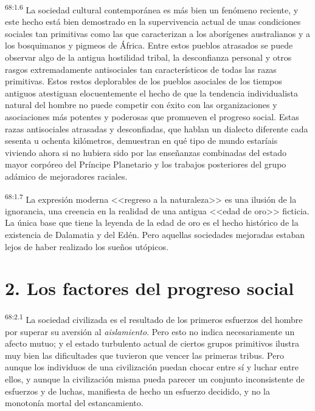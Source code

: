 \par
\textsuperscript{68:1.6} La sociedad cultural contemporánea es más bien un fenómeno reciente, y este hecho está bien demostrado en la supervivencia actual de unas condiciones sociales tan primitivas como las que caracterizan a los aborígenes australianos y a los bosquimanos y pigmeos de África. Entre estos pueblos atrasados se puede observar algo de la antigua hostilidad tribal, la desconfianza personal y otros rasgos extremadamente antisociales tan característicos de todas las razas primitivas. Estos restos deplorables de los pueblos asociales de los tiempos antiguos atestiguan elocuentemente el hecho de que la tendencia individualista natural del hombre no puede competir con éxito con las organizaciones y asociaciones más potentes y poderosas que promueven el progreso social. Estas razas antisociales atrasadas y desconfiadas, que hablan un dialecto diferente cada sesenta u ochenta kilómetros, demuestran en qué tipo de mundo estaríais viviendo ahora si no hubiera sido por las enseñanzas combinadas del estado mayor corpóreo del Príncipe Planetario y los trabajos posteriores del grupo adámico de mejoradores raciales.

\par
\textsuperscript{68:1.7} La expresión moderna <<regreso a la naturaleza>> es una ilusión de la ignorancia, una creencia en la realidad de una antigua <<edad de oro>> ficticia. La única base que tiene la leyenda de la edad de oro es el hecho histórico de la existencia de Dalamatia y del Edén. Pero aquellas sociedades mejoradas estaban lejos de haber realizado los sueños utópicos.

\section*{2. Los factores del progreso social}
\par
\textsuperscript{68:2.1} La sociedad civilizada es el resultado de los primeros esfuerzos del hombre por superar su aversión al \textit{aislamiento}. Pero esto no indica necesariamente un afecto mutuo; y el estado turbulento actual de ciertos grupos primitivos ilustra muy bien las dificultades que tuvieron que vencer las primeras tribus. Pero aunque los individuos de una civilización puedan chocar entre sí y luchar entre ellos, y aunque la civilización misma pueda parecer un conjunto inconsistente de esfuerzos y de luchas, manifiesta de hecho un esfuerzo decidido, y no la monotonía mortal del estancamiento.

